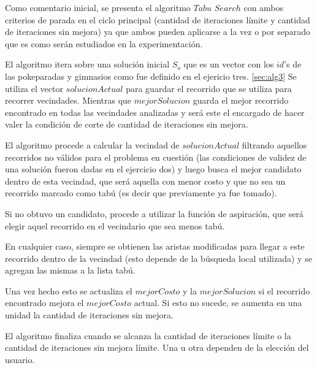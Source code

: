 Como comentario inicial, se presenta el algoritmo $Tabu$ $Search$ con ambos criterios de parada en el ciclo principal (cantidad de iteraciones límite y cantidad de iteraciones sin mejora) ya que ambos pueden aplicarse a la vez o por separado que es como serán estudiados en la experimentación.

El algoritmo itera sobre una solución inicial $S_o$ que es un vector con los $id$'s de las pokeparadas y gimnasios como fue definido en el ejericio tres. \ref{sec:alg3} 
Se utiliza el vector $solucionActual$ para guardar el recorrido que se utiliza para recorrer vecindades. Mientras que $mejorSolucion$ guarda el mejor recorrido encontrado en todas las vecindades analizadas y será este el encargado de hacer valer la condición de corte de cantidad de iteraciones sin mejora.

El algoritmo procede a calcular la vecindad de $solucionActual$ filtrando aquellos recorridos no válidos para el problema en cuestión (las condiciones de validez de una solución fueron dadas en el ejercicio dos) y luego busca el mejor candidato dentro de esta vecindad, que será aquella con menor costo y que no sea un recorrido marcado como tabú (es decir que previamente ya fue tomado).

Si no obtuvo un candidato, procede a utilizar la función de aspiración, que será elegir aquel recorrido en el vecindario que sea menos tabú.

En cualquier caso, siempre se obtienen las aristas modificadas para llegar a este recorrido dentro de la vecindad (esto depende de la búsqueda local utilizada) y se agregan las mismas a la lista tabú.

Una vez hecho esto se actualiza el $mejorCosto$ y la $mejorSolucion$ si el recorrido encontrado mejora el $mejorCosto$ actual. Si esto no sucede, se aumenta en una unidad la cantidad de iteraciones sin mejora. 

El algoritmo finaliza cuando se alcanza la cantidad de iteraciones límite o la cantidad de iteraciones sin mejora límite. Una u otra dependen de la elección del usuario.

